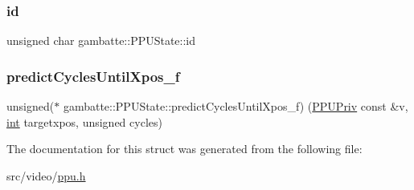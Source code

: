 \subsubsection{\texorpdfstring{id}{id}}
{\footnotesize\ttfamily unsigned char gambatte\+::\+P\+P\+U\+State\+::id}

\mbox{\label{structgambatte_1_1PPUState_a6eb2480038e1ff8e9e1ee59d1486ade9}} 
\subsubsection{\texorpdfstring{predict\+Cycles\+Until\+Xpos\+\_\+f}{predictCyclesUntilXpos\_f}}
{\footnotesize\ttfamily unsigned($\ast$ gambatte\+::\+P\+P\+U\+State\+::predict\+Cycles\+Until\+Xpos\+\_\+f) (\hyperlink{structgambatte_1_1PPUPriv}{P\+P\+U\+Priv} const \&v, \hyperlink{ioapi_8h_a787fa3cf048117ba7123753c1e74fcd6}{int} targetxpos, unsigned cycles)}



The documentation for this struct was generated from the following file\+:\begin{DoxyCompactItemize}
\item 
src/video/\hyperlink{ppu_8h}{ppu.\+h}\end{DoxyCompactItemize}
